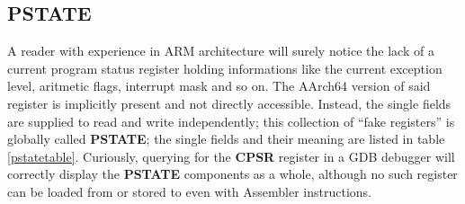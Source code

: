 \documentclass[12pt,a4paper,openright,twoside]{report}
\begin{document}
\subsection{PSTATE}
A reader with experience in ARM architecture will surely notice the lack of a
current program status register holding informations like the current exception
level, aritmetic flags, interrupt mask and so on.
The AArch64 version of said register is implicitly present and not directly 
accessible. Instead, the single fields are supplied to read and
write independently; this collection of ``fake registers'' is globally called 
\textbf{PSTATE}; the single fields and their meaning are listed in table \ref{pstatetable}.
 Curiously, querying for the \textbf{CPSR} register in a GDB 
debugger will correctly display the \textbf{PSTATE} components as a whole, although
no such register can be loaded from or stored to even with Assembler instructions.
\end{document}
